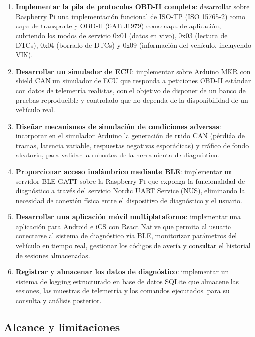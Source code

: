 \begin{enumerate}
    \item[\textbf{O1.}] \textbf{Implementar la pila de protocolos OBD-II completa}: desarrollar sobre Raspberry Pi una implementación funcional de ISO-TP (ISO 15765-2) como capa de transporte y OBD-II (SAE J1979) como capa de aplicación, cubriendo los modos de servicio 0x01 (datos en vivo), 0x03 (lectura de DTCs), 0x04 (borrado de DTCs) y 0x09 (información del vehículo, incluyendo VIN).

    \item[\textbf{O2.}] \textbf{Desarrollar un simulador de ECU}: implementar sobre Arduino MKR con shield CAN un simulador de ECU que responda a peticiones OBD-II estándar con datos de telemetría realistas, con el objetivo de disponer de un banco de pruebas reproducible y controlado que no dependa de la disponibilidad de un vehículo real.

    \item[\textbf{O3.}] \textbf{Diseñar mecanismos de simulación de condiciones adversas}: incorporar en el simulador Arduino la generación de ruido CAN (pérdida de tramas, latencia variable, respuestas negativas esporádicas) y tráfico de fondo aleatorio, para validar la robustez de la herramienta de diagnóstico.

    \item[\textbf{O4.}] \textbf{Proporcionar acceso inalámbrico mediante BLE}: implementar un servidor BLE GATT sobre la Raspberry Pi que exponga la funcionalidad de diagnóstico a través del servicio Nordic UART Service (NUS), eliminando la necesidad de conexión física entre el dispositivo de diagnóstico y el usuario.

    \item[\textbf{O5.}] \textbf{Desarrollar una aplicación móvil multiplataforma}: implementar una aplicación para Android e iOS con React Native que permita al usuario conectarse al sistema de diagnóstico vía BLE, monitorizar parámetros del vehículo en tiempo real, gestionar los códigos de avería y consultar el historial de sesiones almacenadas.

    \item[\textbf{O6.}] \textbf{Registrar y almacenar los datos de diagnóstico}: implementar un sistema de logging estructurado en base de datos SQLite que almacene las sesiones, las muestras de telemetría y los comandos ejecutados, para su consulta y análisis posterior.
\end{enumerate}

\subsection{Alcance y limitaciones}
\label{sec:alcance}

